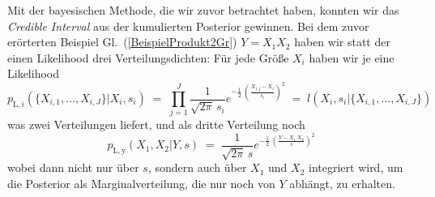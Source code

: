 Mit der bayesischen Methode, die wir zuvor betrachtet haben, konnten wir das
\textsl{Credible Interval} aus der kumulierten Posterior gewinnen. Bei dem
zuvor erörterten Beispiel Gl.~(\ref{BeispielProdukt2Gr}) $Y = X_1 X_2$ haben wir statt
der einen Likelihood drei Verteilungsdichten:
Für jede Größe $X_i$ haben wir je eine Likelihood
\begin{equation}
p_{\mathrm{L},i}(\{X_{i,1}, \dots, X_{i,J}\} | X_i, s_i) \; = \;
\prod\limits_{j=1}^J \frac{1}{\sqrt{2 \pi} \, s_i}
 e^{- \frac{1}{2} \, \left( \frac{X_{i,j} - X_i}{s_i} \right)^2 }  \; = \;
l(X_i, s_i | \{X_{i,1}, \dots, X_{i,J}\})
\end{equation}
was zwei Verteilungen liefert, und als dritte Verteilung noch
\begin{equation}
p_\mathrm{L,y}( X_1, X_2 | Y, s) \; = \;
\frac{1}{\sqrt{2 \pi} \, s}
 e^{- \frac{1}{2} \, \left( \frac{Y - X_1 \, X_2}{s} \right)^2 }
\end{equation}
wobei dann nicht nur über $s$, sondern auch über $X_1$ und $X_2$ integriert wird, um die
Posterior als Marginalverteilung, die nur noch von $Y$ abhängt, zu erhalten.

